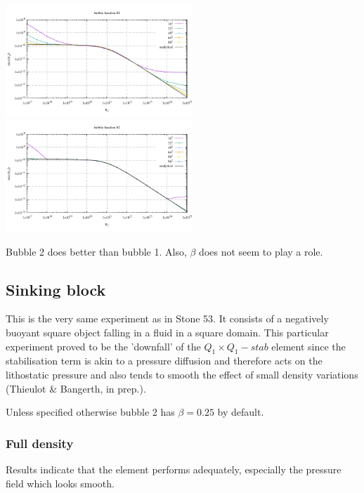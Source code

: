 \begin{center}
\includegraphics[width=7cm]{python_codes/fieldstone_72/results/RT/vy_b1}
\includegraphics[width=7cm]{python_codes/fieldstone_72/results/RT/vy_b2}
\end{center}

Bubble 2 does better than bubble 1. Also, $\beta$ does not seem to play a role.

\subsection*{Sinking block}
This is the very same experiment as in Stone 53. It consists of a negatively buoyant 
square object falling in a fluid in a square domain. 
This particular experiment proved to be the 'downfall' of the $Q_1\times Q_1-stab$ element
since the stabilisation term is akin to a pressure diffusion and therefore
acts on the lithostatic pressure and also tends to smooth the effect of small 
density variations (Thieulot \& Bangerth, in prep.). 

Unless specified otherwise bubble 2 has $\beta=0.25$ by default.

\subsubsection*{Full density} 
Results indicate that the element performs adequately, especially the 
pressure field which looks smooth.  

